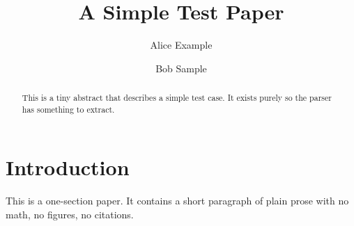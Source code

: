\documentclass[12pt]{article}
\title{A Simple Test Paper}
\author{Alice Example \and Bob Sample}
\begin{document}
\maketitle

\begin{abstract}
This is a tiny abstract that describes a simple test case. It exists
purely so the parser has something to extract.
\end{abstract}

\section{Introduction}
This is a one-section paper. It contains a short paragraph of plain
prose with no math, no figures, no citations.
\end{document}
